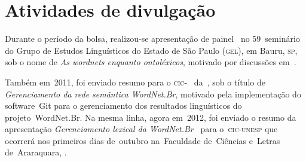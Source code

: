 \chapter{Atividades de divulgação}

Durante o período da bolsa, realizou-se apresentação de
painel~\cite{araujoetal} no 59\textordmasculine~seminário do Grupo de Estudos
Linguísticos do Estado de São Paulo (\textsc{gel}), em Bauru, \textsc{sp}, sob o
nome de \textit{As wordnets enquanto ontoléxicos}, motivado por discussões
em~.

Também em~2011, foi enviado resumo para o \textsc{cic}-\unesp~\cite{resumocic}
da~\unesp, sob o título de \textit{Gerenciamento da rede semântica WordNet.Br},
motivado pela implementação do software~Git para o gerenciamento dos resultados
linguísticos do projeto~WordNet.Br. Na mesma linha, agora em~2012, foi enviado
o resumo da apresentação \textit{Gerenciamento lexical da
WordNet.Br}~\cite{resumocic2} para o~\textsc{cic-unesp} que ocorrerá nos
primeiros dias de~outubro na~Faculdade de~Ciências e~Letras de~Araraquara,
\unesp.
